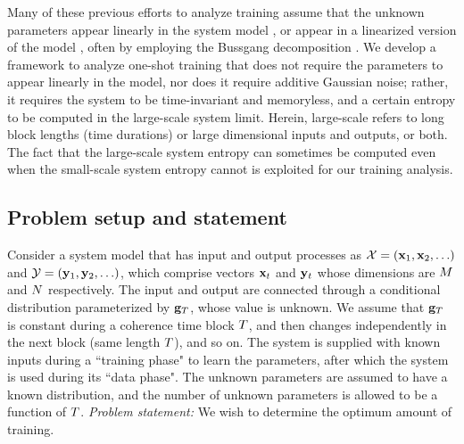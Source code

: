 \documentclass[12pt, draftclsnofoot,journal,onecolumn]{IEEEtran}
\begin{document}
Many of these previous efforts to analyze training assume that the unknown parameters appear linearly in the system model \cite{hassibi2003much,muharar2020optimal,takeuchi2012large,takeuchi2013achievable,sheng2017optimal}, or appear in a linearized version of the model \cite{li2016much,li2017channel}, often by employing the Bussgang decomposition \cite{bussgang1952crosscorrelation}.  We develop a framework to analyze one-shot training that does not require the parameters to appear linearly in the model, nor does it require additive Gaussian noise; rather, it requires the system to be time-invariant and memoryless, 
and a certain entropy to be computed in the large-scale system limit.
Herein, large-scale refers to long block lengths (time durations) or large dimensional inputs and outputs, or both.
The fact that the large-scale system entropy can sometimes be computed even when the small-scale system entropy cannot is exploited for our training analysis.  

\subsection{Problem setup and statement}

Consider a system model that has input and output processes as $\mathcal{X}=({\mathbf{x}}_1,{\mathbf{x}}_2,\ldots)$ and $\mathcal{Y}=({\mathbf{y}}_{1},{\mathbf{y}}_{2},\ldots)$, which comprise vectors ${\mathbf{x}}_t$ and ${\mathbf{y}}_{t}$ whose dimensions are $M$ and $N$ respectively. The input and output are connected through a conditional distribution parameterized by ${\mathbf{g}}_{T}$, whose value is unknown.  We assume that ${\mathbf{g}}_{T}$ is constant during a coherence time block $T$, and then changes independently in the next block (same length $T$), and so on. 
The system is supplied with known inputs during a ``training phase" to learn the parameters, after which the system is used during its ``data phase".   The unknown parameters are assumed to have a known distribution, and the number of unknown parameters is allowed to be a function of $T$.  {\em Problem statement:} We wish to determine the optimum amount of training.
\end{document}

